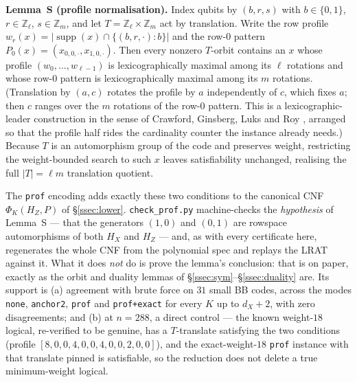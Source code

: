\documentclass[11pt]{amsart}
\newcommand{\supp}{\operatorname{supp}}
\newcommand{\HX}{H_{X}}
\newcommand{\HZ}{H_{Z}}
\newcommand{\dX}{d_{X}}
\theoremstyle{plain}
\theoremstyle{definition}
\theoremstyle{remark}
\begin{document}
\smallskip
\noindent\textbf{Lemma~S (profile normalisation).} Index qubits by $(b,r,s)$
with $b\in\{0,1\}$, $r\in\mathbb Z_{\ell}$, $s\in\mathbb Z_{m}$, and let
$T=\mathbb Z_{\ell}\times\mathbb Z_{m}$ act by translation. Write the row profile
$w_{r}(x)=|\supp(x)\cap\{(b,r,\cdot):b\}|$ and the row-$0$ pattern
$P_{0}(x)=(x_{0,0,\cdot},x_{1,0,\cdot})$. Then every nonzero $T$-orbit contains
an $x$ whose profile $(w_{0},\dots,w_{\ell-1})$ is lexicographically maximal
among its $\ell$ rotations and whose row-$0$ pattern is lexicographically
maximal among its $m$ rotations. (Translation by $(a,c)$ rotates the profile by
$a$ independently of $c$, which fixes $a$; then $c$ ranges over the $m$ rotations
of the row-$0$ pattern. This is a lexicographic-leader construction in the sense
of Crawford, Ginsberg, Luks and Roy \cite{CGLR}, arranged so that the profile
half rides the cardinality counter the instance already needs.) Because $T$ is
an automorphism group of the code and preserves weight, restricting the
weight-bounded search to such $x$ leaves satisfiability unchanged, realising the
full $|T|=\ell m$ translation quotient.

The \texttt{prof} encoding adds exactly these two conditions to the canonical
CNF $\Phi_{K}(\HZ,P)$ of \S\ref{ssec:lower}. \texttt{check\_prof.py}
machine-checks the \emph{hypothesis} of Lemma~S --- that the generators $(1,0)$
and $(0,1)$ are rowspace automorphisms of both $\HX$ and $\HZ$ --- and, as with
every certificate here, regenerates the whole CNF from the polynomial spec and
replays the LRAT against it. What it does \emph{not} do is prove the lemma's
conclusion: that is on paper, exactly as the orbit and duality lemmas of
\S\ref{ssec:sym}--\S\ref{ssec:duality} are. Its support is (a) agreement with
brute force on $31$ small BB codes, across the modes \texttt{none},
\texttt{anchor2}, \texttt{prof} and \texttt{prof+exact} for every $K$ up to
$\dX+2$, with zero disagreements; and (b) at $n=288$, a direct control ---
the known weight-$18$ logical, re-verified to be genuine, has a $T$-translate
satisfying the two conditions (profile $[8,0,0,4,0,0,4,0,0,2,0,0]$), and the
exact-weight-$18$ \texttt{prof} instance with that translate pinned is
satisfiable, so the reduction does not delete a true minimum-weight logical.
\end{document}
